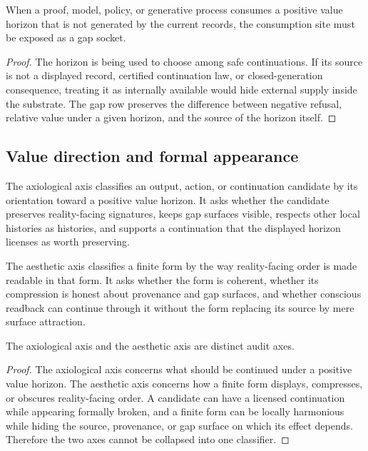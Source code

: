 \begin{corollary}
\label{cor:philosophy-value-supply-gap-discipline}
When a proof, model, policy, or generative process consumes a positive
value horizon that is not generated by the current records, the
consumption site must be exposed as a gap socket.
\end{corollary}
\begin{proof}
The horizon is being used to choose among safe continuations. If its
source is not a displayed record, certified continuation law, or
closed-generation consequence, treating it as internally available
would hide external supply inside the substrate. The gap row preserves
the difference between negative refusal, relative value under a given
horizon, and the source of the horizon itself.
\end{proof}

\subsection{Value direction and formal appearance}
\label{subsec:philosophy-value-direction-formal-appearance}

\begin{definition}
\label{def:philosophy-axiological-axis}
The axiological axis classifies an output, action, or continuation
candidate by its orientation toward a positive value horizon. It asks
whether the candidate preserves reality-facing signatures, keeps gap
surfaces visible, respects other local histories as histories, and
supports a continuation that the displayed horizon licenses as worth
preserving.
\end{definition}

\begin{definition}
\label{def:philosophy-aesthetic-axis}
The aesthetic axis classifies a finite form by the way reality-facing
order is made readable in that form. It asks whether the form is
coherent, whether its compression is honest about provenance and gap
surfaces, and whether conscious readback can continue through it
without the form replacing its source by mere surface attraction.
\end{definition}

\begin{theorem}
\label{thm:philosophy-value-form-axes-distinct}
The axiological axis and the aesthetic axis are distinct audit axes.
\end{theorem}
\begin{proof}
The axiological axis concerns what should be continued under a
positive value horizon. The aesthetic axis concerns how a finite form
displays, compresses, or obscures reality-facing order. A candidate can
have a licensed continuation while appearing formally broken, and a
finite form can be locally harmonious while hiding the source,
provenance, or gap surface on which its effect depends. Therefore the
two axes cannot be collapsed into one classifier.
\end{proof}

